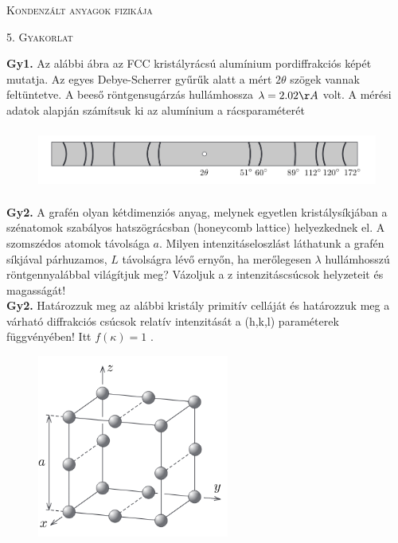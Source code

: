 \documentclass[12pt]{article}
\begin{document}
\centerline{
\textsc{\Large{ Kondenzált anyagok fizikája}}
}
\centerline{ 
\textsc{\large{5. Gyakorlat}}
}
\vspace{10mm}

\textbf{Gy1.} Az  alábbi ábra az  FCC  kristályrácsú alumínium  pordiffrakciós képét  mutatja.  Az  egyes Debye-Scherrer gyűrűk alatt a mért
$2\theta$ szögek vannak feltüntetve. A beeső röntgensugárzás hullámhossza
 $\lambda= 2.02\AA$ volt. A mérési adatok alapján számítsuk ki az alumínium
a rácsparaméterét

\begin{figure}[h!]
\begin{center}
\includegraphics[height=2cm]{../images/Aldebyescherrer.png}
 \end{center}
\end{figure}

\textbf{Gy2.} A  grafén  olyan  kétdimenziós  anyag,  melynek  egyetlen  kristálysíkjában  a  szénatomok szabályos hatszögrácsban (honeycomb  lattice)  helyezkednek  el.  A  szomszédos  atomok  távolsága $a$.  Milyen
intenzitáseloszlást láthatunk  a  grafén  síkjával  párhuzamos, $L$
távolságra lévő  ernyőn, ha  merőlegesen $\lambda$ hullámhosszú röntgennyalábbal világítjuk  meg?  Vázoljuk  a z  intenzitáscsúcsok helyzeteit és magasságát!
\\

\textbf{Gy2.} Határozzuk meg az alábbi kristály primitív celláját és határozzuk meg a várható diffrakciós csúcsok relatív intenzitását a (h,k,l) paraméterek függvényében! Itt $f(\kappa)=1$ .
\begin{figure}[h!]
\begin{center}
\includegraphics[height=6cm]{../images/5furakocka.png}
 \end{center}
\end{figure}
\end{document}
